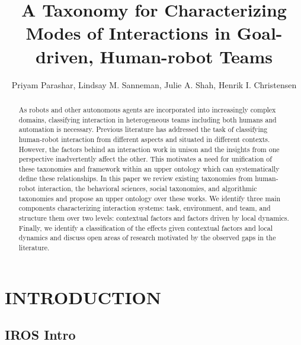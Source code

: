 \documentclass[letterpaper, 10 pt, conference]{ieeeconf}  %
\title{\LARGE \bf
A Taxonomy for Characterizing Modes of Interactions in Goal-driven, Human-robot Teams
}
\author{
Priyam Parashar, Lindsay M. Sanneman, Julie A. Shah, Henrik I. Christensen
}
\theoremstyle{definition}
\begin{document}
\maketitle
\thispagestyle{empty}
\pagestyle{empty}


\begin{abstract}

As robots and other autonomous agents are incorporated into increasingly complex domains, classifying interaction in heterogeneous teams including both humans and automation is necessary. Previous literature has addressed the task of classifying human-robot interaction from different aspects and situated in different contexts. However, the factors behind an interaction work in unison and the insights from one perspective inadvertently affect the other. This motivates a need for unification of these taxonomies and framework within an upper ontology which can systematically define these relationships. In this paper we review existing taxonomies from human-robot interaction, the behavioral sciences, social taxonomies, and algorithmic taxonomies and propose an upper ontology over these works. We identify three main components characterizing interaction systems: task, environment, and team, and structure them over two levels: contextual factors and factors driven by local dynamics. Finally, we identify a classification of the effects given contextual factors and local dynamics and discuss open areas of research motivated by the observed gaps in the literature. 

\end{abstract}



\section{INTRODUCTION}
\label{sec:intro}

\subsection{IROS Intro}
\end{document}
